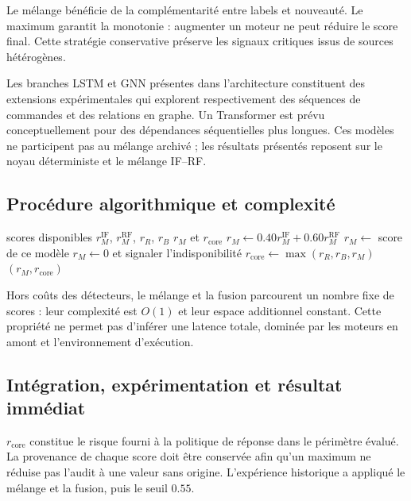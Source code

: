\documentclass[11pt,a4paper,oneside]{report}
\theoremstyle{definition}
\theoremstyle{plain}
\begin{document}
Le mélange bénéficie de la complémentarité entre labels et nouveauté. Le maximum
garantit la monotonie : augmenter un moteur ne peut réduire le score final. Cette
stratégie conservative préserve les signaux critiques issus de sources hétérogènes.

Les branches LSTM et GNN présentes dans l'architecture constituent des extensions
expérimentales qui explorent respectivement des séquences de commandes et des
relations en graphe. Un Transformer est prévu conceptuellement pour des dépendances
séquentielles plus longues. Ces modèles ne participent pas au mélange archivé ;
les résultats présentés reposent sur le noyau déterministe et le mélange IF--RF.

\subsection*{Procédure algorithmique et complexité}

\begin{algorithm}[H]
\caption{Mélange appris et fusion conservatrice}
\label{alg:ai-ro-fusion}
\begin{algorithmic}[1]
\Require scores disponibles $r_M^{\mathrm{IF}}$, $r_M^{\mathrm{RF}}$, $r_R$, $r_B$
\Ensure $r_M$ et $r_{\mathrm{core}}$
  \State $r_M\leftarrow0.40r_M^{\mathrm{IF}}+0.60r_M^{\mathrm{RF}}$
  \State $r_M\leftarrow$ score de ce modèle
\Else
  \State $r_M\leftarrow0$ et signaler l'indisponibilité
\EndIf
\State $r_{\mathrm{core}}\leftarrow\max(r_R,r_B,r_M)$
\State \Return $(r_M,r_{\mathrm{core}})$
\end{algorithmic}
\end{algorithm}

Hors coûts des détecteurs, le mélange et la fusion parcourent un nombre fixe de scores : leur complexité est $O(1)$ et leur espace additionnel constant. Cette propriété ne permet pas d'inférer une latence totale, dominée par les moteurs en amont et l'environnement d'exécution.

\subsection*{Intégration, expérimentation et résultat immédiat}

$r_{\mathrm{core}}$ constitue le risque fourni à la politique de réponse dans le périmètre évalué. La provenance de chaque score doit être conservée afin qu'un maximum ne réduise pas l'audit à une valeur sans origine. L'expérience historique a appliqué le mélange et la fusion, puis le seuil $0.55$.
\end{document}
